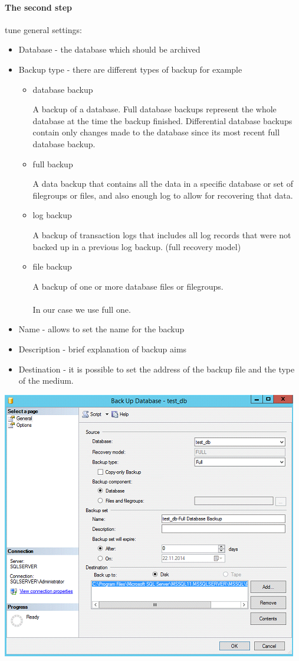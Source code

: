 \documentclass[english]{article}
\begin{document}
\paragraph{The second step} tune general settings:
\begin{itemize}
\item Database - the database which should be archived
\item Backup type - there are different types of backup for example
\begin{itemize}
\item database backup

    A backup of a database. Full database backups represent the whole database at the time the backup finished. Differential database backups contain only changes made to the database since its most recent full database backup.

\item full backup

    A data backup that contains all the data in a specific database or set of filegroups or files, and also enough log to allow for recovering that data.
\item log backup

    A backup of transaction logs that includes all log records that were not backed up in a previous log backup. (full recovery model)
\item file backup

    A backup of one or more database files or filegroups.\cite{backupTypes}
    \\ \\
    In our case we use full one.


\end{itemize}
\item Name - allows to set the name for the backup
\item Description - brief explanation of  backup aims
\item Destination - it is possible to set the address of the backup file and the type of the medium.
\end{itemize}
\centerline{\includegraphics[scale=0.8]{administration/2}}
\end{document}
